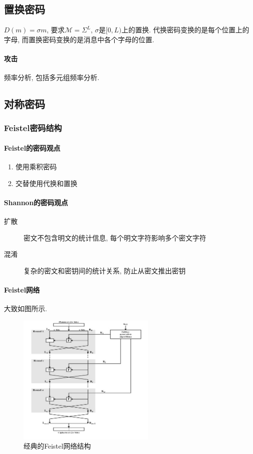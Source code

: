 \documentclass{ctexart}
\begin{document}
\subsection{置换密码}
    $D(m) = \sigma m$, 要求$\mathcal{M} = \Sigma^L$, $\sigma$是$[0, L)$上的置换.
    代换密码变换的是每个位置上的字母, 而置换密码变换的是消息中各个字母的位置.
\paragraph{攻击} 频率分析, 包括多元组频率分析.

\subsection{对称密码}
\subsubsection{Feistel密码结构}
\paragraph{Feistel的密码观点}
    \begin{enumerate}
        \item 使用乘积密码
        \item 交替使用代换和置换
    \end{enumerate}
\paragraph{Shannon的密码观点}
    \begin{description}
        \item[扩散] 密文不包含明文的统计信息, 每个明文字符影响多个密文字符
        \item[混淆] 复杂的密文和密钥间的统计关系, 防止从密文推出密钥
    \end{description}
\paragraph{Feistel网络}
    大致如图所示.
    \begin{figure}[ht!]
    \centering
    \includegraphics[width=0.6\textwidth]{feistel-net.png}
    \caption{经典的Feistel网络结构}
    \label{lenet-structure}
    \end{figure}
\end{document}

